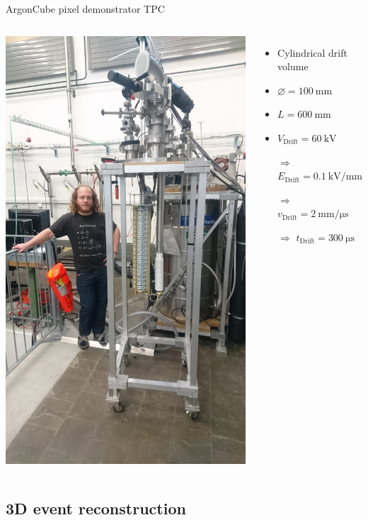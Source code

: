 \documentclass[]{beamer}
\newcommand*{\m}{\mathrm}
\newcommand*{\emphcol}{red}
\newcommand*{\AC}{{ArgonCube}}
\begin{document}
\begin{frame}{\AC{} pixel demonstrator TPC}
	\begin{columns}[c]
		\centering
		\includegraphics[viewport=1200 200 2500 1800, clip, height=\textwidth, angle=-90]{defence/TPC}
		\begin{itemize}
			\item Cylindrical drift volume
			\item $\varnothing = \SI{100}{\milli\meter}$
			\item $L = \SI{600}{\milli\meter}$
			\item $V_{\m{Drift}} = \SI{60}{\kilo\volt}$
			\item[$\Rightarrow$] {\color{\emphcol} $E_{\m{Drift}} = \SI{0.1}{\kilo\volt\per\milli\meter}$}
			\item[$\Rightarrow$] $v_{\m{Drift}} = \SI{2}{\milli\meter\per\micro\second}$
			\item[$\Rightarrow$] {\color{\emphcol} $t_{\m{Drift}} = \SI{300}{\micro\second}$}
		\end{itemize}
	\end{columns}
\end{frame}

\subsection{3D event reconstruction}
\end{document}
